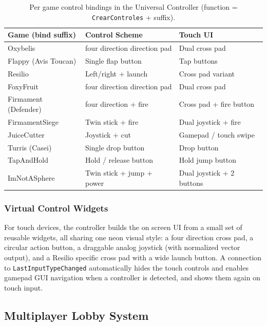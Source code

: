 \documentclass[12pt,letterpaper]{article}
\begin{document}
\begin{table}[H]
\centering
\footnotesize
\begin{tabular}{|p{3cm}|p{6cm}|p{4.5cm}|}
\hline
\textbf{Game (bind suffix)} & \textbf{Control Scheme} & \textbf{Touch UI} \\
\hline
Oxybelis & four direction direction pad & Dual cross pad \\
\hline
Flappy (Avis Toucan) & Single flap button & Tap buttons \\
\hline
Resilio & Left/right + launch & Cross pad variant \\
\hline
FoxyFruit & four direction direction pad & Dual cross pad \\
\hline
Firmament (Defender) & four direction + fire & Cross pad + fire button \\
\hline
FirmamentSiege & Twin stick + fire & Dual joystick + fire \\
\hline
JuiceCutter & Joystick + cut & Gamepad / touch swipe \\
\hline
Turris (Casei) & Single drop button & Drop button \\
\hline
TapAndHold & Hold / release button & Hold jump button \\
\hline
ImNotASphere & Twin stick + jump + power & Dual joystick + 2 buttons \\
\hline
\end{tabular}
\caption{Per game control bindings in the Universal Controller (function = \texttt{CrearControles} + suffix).}
\end{table}

\subsubsection{Virtual Control Widgets}

For touch devices, the controller builds the on screen UI from a small set of reusable widgets, all sharing one neon visual style: a four direction cross pad, a circular action button, a draggable analog joystick (with normalized vector output), and a Resilio specific cross pad with a wide launch button. A connection to \texttt{LastInputTypeChanged} automatically hides the touch controls and enables gamepad GUI navigation when a controller is detected, and shows them again on touch input.

\subsection{Multiplayer Lobby System}
\end{document}
